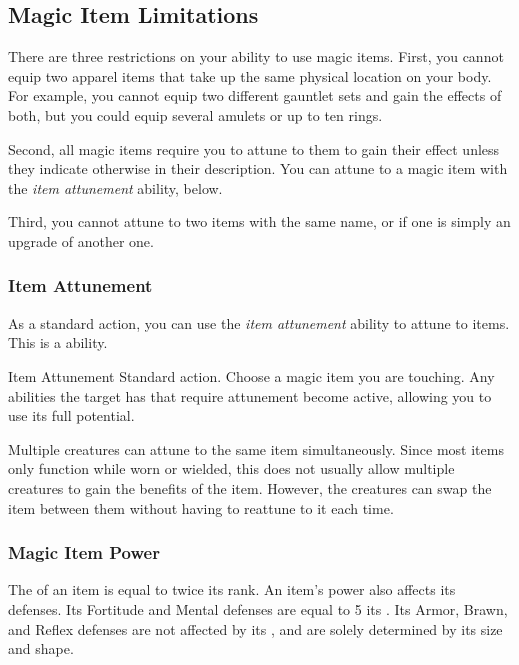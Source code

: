 
  \subsection{Magic Item Limitations}

    There are three restrictions on your ability to use magic items.
    First, you cannot equip two apparel items that take up the same physical location on your body.
    For example, you cannot equip two different gauntlet sets and gain the effects of both, but you could equip several amulets or up to ten rings.

    Second, all magic items require you to attune to them to gain their effect unless they indicate otherwise in their description.
    You can attune to a magic item with the \textit{item attunement} ability, below.

    Third, you cannot attune to two items with the same name, or if one is simply an upgrade of another one.

    \subsubsection{Item Attunement}\label{Item Attunement}

      As a standard action, you can use the \textit{item attunement} ability to attune to items.
      This is a \magical ability.

      \begin{attuneability}{Item Attunement}{}
        \abilityusagetime Standard action.
        \rankline
        Choose a magic item you are touching.
        Any abilities the target has that require attunement become active, allowing you to use its full potential.
      \end{attuneability}

       Multiple creatures can attune to the same item simultaneously.
      Since most items only function while worn or wielded, this does not usually allow multiple creatures to gain the benefits of the item.
      However, the creatures can swap the item between them without having to reattune to it each time.

    \subsubsection{Magic Item Power}\label{Magic Item Power}
      The  of an item is equal to twice its rank.
      An item's power also affects its defenses.
      Its Fortitude and Mental defenses are equal to 5 \add its .
      Its Armor, Brawn, and Reflex defenses are not affected by its , and are solely determined by its size and shape.

